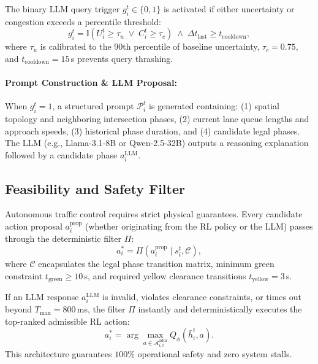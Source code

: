 \documentclass[11pt,a4paper]{article}
\begin{document}
The binary LLM query trigger $g_i^t \in \{0, 1\}$ is activated if either uncertainty or congestion exceeds a percentile threshold:
\begin{equation}
    g_i^t = \mathbb{I}\left( U_i^t \geq \tau_u \;\lor\; C_i^t \geq \tau_c \right) \;\land\; \Delta t_{\text{last}} \geq t_{\text{cooldown}},
\end{equation}
where $\tau_u$ is calibrated to the 90th percentile of baseline uncertainty, $\tau_c = 0.75$, and $t_{\text{cooldown}} = 15$\,s prevents query thrashing.

\paragraph{Prompt Construction \& LLM Proposal:}
When $g_i^t = 1$, a structured prompt $\mathcal{P}_i^t$ is generated containing: (1) spatial topology and neighboring intersection phases, (2) current lane queue lengths and approach speeds, (3) historical phase duration, and (4) candidate legal phases. The LLM (e.g., Llama-3.1-8B or Qwen-2.5-32B) outputs a reasoning explanation followed by a candidate phase $a_i^{\text{LLM}}$.

\subsection{Feasibility and Safety Filter}
Autonomous traffic control requires strict physical guarantees. Every candidate action proposal $a_i^{\text{prop}}$ (whether originating from the RL policy or the LLM) passes through the deterministic filter $\Pi$:
\begin{equation}
    a_i^* = \Pi(a_i^{\text{prop}} \mid s_i^t, \mathcal{C}),
\end{equation}
where $\mathcal{C}$ encapsulates the legal phase transition matrix, minimum green constraint $t_{\text{green}} \geq 10$\,s, and required yellow clearance transitions $t_{\text{yellow}} = 3$\,s. 

If an LLM response $a_i^{\text{LLM}}$ is invalid, violates clearance constraints, or times out beyond $T_{\text{max}} = 800$\,ms, the filter $\Pi$ instantly and deterministically executes the top-ranked admissible RL action:
\begin{equation}
    a_i^* = \arg\max_{a \in \mathcal{A}_{i,t}^{\text{adm}}} Q_\phi(\bar{h}_i^t, a).
\end{equation}
This architecture guarantees $100\%$ operational safety and zero system stalls.
\end{document}

